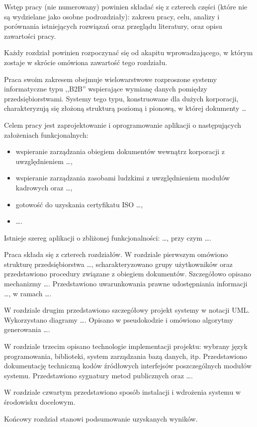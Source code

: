 Wstęp pracy (nie numerowany) powinien składać się z czterech części (które nie są wydzielane jako osobne podrozdziały): zakresu pracy, celu, analizy i porównania istniejących rozwiązań oraz przeglądu literatury, oraz opisu zawartości pracy.

Każdy rozdział powinien rozpoczynać się od akapitu wprowadzającego, w którym zostaje w skrócie omówiona zawartość tego rozdziału.

{\color{dgray}
Praca swoim zakresem obejmuje wielowarstwowe rozproszone systemy informatyczne typu ,,B2B'' wspierające wymianę danych pomiędzy przedsiębiorstwami. Systemy tego typu, konstruowane dla dużych korporacji, charakteryzują się złożoną strukturą poziomą i pionową, w której dokumenty \ldots

Celem pracy jest zaprojektowanie i oprogramowanie aplikacji o następujących założeniach funkcjonalnych:
\begin{itemize}
    \item wspieranie zarządzania obiegiem dokumentów wewnątrz korporacji z uwzględnieniem \ldots,
	\item wspieranie zarządzania zasobami ludzkimi z uwzględnieniem modułów kadrowych oraz \ldots,
	\item gotowość do uzyskania certyfikatu ISO \ldots,
	\item \ldots.
\end{itemize}

Istnieje szereg aplikacji o zbliżonej funkcjonalności: \ldots, przy czym \ldots.

Praca składa się z czterech rozdziałów.
W rozdziale pierwszym omówiono strukturę przedsiębiorstwa \ldots, scharakteryzowano grupy użytkowników oraz przedstawiono procedury związane z obiegiem dokumentów. Szczegółowo opisano mechanizmy \ldots. Przedstawiono uwarunkowania prawne udostępniania informacji \ldots, w ramach \ldots.

W rozdziale drugim przedstawiono szczegółowy projekt systemy w notacji UML. Wykorzystano diagramy \ldots.
Opisano w pseudokodzie i omówiono algorytmy generowania \ldots.

W rozdziale trzecim opisano technologie implementacji projektu: wybrany język programowania, biblioteki, system zarządzania bazą danych, itp.  Przedstawiono dokumentację techniczną kodów źródłowych interfejsów poszczególnych modułów systemu. Przedstawiono sygnatury metod publicznych oraz \ldots.

W rozdziale czwartym przedstawiono sposób instalacji i wdrożenia systemu w środowisku docelowym.

Końcowy rozdział stanowi podsumowanie uzyskanych wyników.
}

